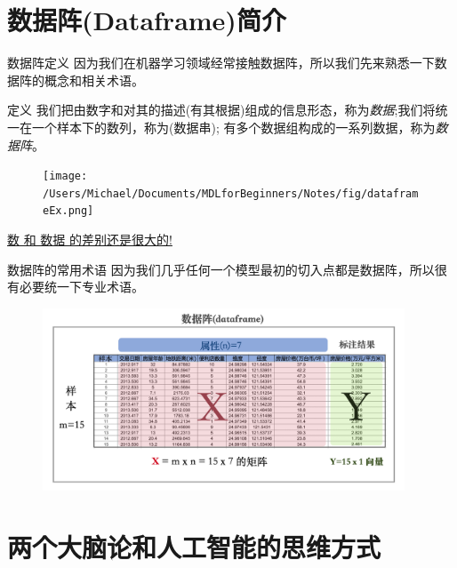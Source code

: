\documentclass[handout]{ctexbeamer}
\begin{document}
\section{数据阵(Dataframe)简介}

\begin{frame}[fragile]{数据阵定义}
	因为我们在机器学习领域经常接触数据阵，所以我们先来熟悉一下数据阵的概念和相关术语。
		
\begin{block}{定义}
	我们把由数字和对其的描述(有其根据)组成的信息形态，称为\textit{数据};我们将统一在一个样本下的数列，称为(数据串); 有多个数据组构成的一系列数据，称为\textit{数据阵}。
\end{block}
\begin{figure}[H]
	\centering
	\texttt{[image: /Users/Michael/Documents/MDLforBeginners/Notes/fig/dataframeEx.png]}
\end{figure}

\underline{数 和 数据 的差别还是很大的!}
\end{frame}


\begin{frame}{数据阵的常用术语}
	因为我们几乎任何一个模型最初的切入点都是数据阵，所以很有必要统一下专业术语。
	\begin{figure}[H]
		\centering
		\includegraphics[width=0.96\textwidth]{fig/dataframeVis}
	\end{figure}
\end{frame}

\section{两个大脑论和人工智能的思维方式}
\end{document}
